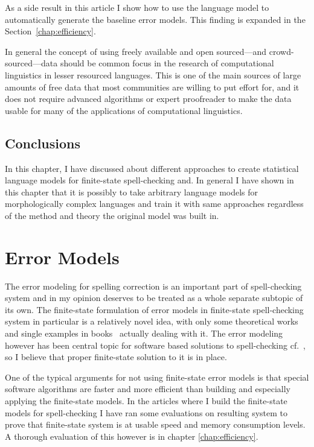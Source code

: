 \documentclass[officiallayout]{unihelcompling}
\begin{document}
As a side result in this article I show how to use the language model to
automatically generate the baseline error models. This finding is expanded in
the Section~\ref{chap:efficiency}.

In general the concept of using freely available and open sourced---and
crowd-sourced---data should be common focus in the research of computational
linguistics in lesser resourced languages. This is one of the main sources of
large amounts of free data that most communities are willing to put effort for,
and it does not require advanced algorithms or expert proofreader to make the
data usable for many of the applications of computational linguistics.

\section{Conclusions}

In this chapter, I have discussed about different approaches to create
statistical language models for finite-state spell-checking and.  In general I
have shown in this chapter that it is possibly to take arbitrary language
models for morphologically complex languages and train it with same approaches
regardless of the method and theory the original model was built in.


\chapter{Error Models}
\label{chap:error-models}

The error modeling for spelling correction is an important part of
spell-checking system and in my opinion deserves to be treated as a whole
separate subtopic of its own. The finite-state formulation of error models in
finite-state spell-checking system in particular is a relatively novel idea,
with only some theoretical works \citep{agata2002typographical,mohri2003edit}
and single examples in books~\citep{beesley2003finite} actually dealing with
it.  The error modeling however has been central topic for software based
solutions to spell-checking
cf.~\citet{deorowicz2005correcting,kukich1992spelling,mitton2009ordering,deorowicz2005correcting},
so I believe that proper finite-state solution to it is in place.

One of the typical arguments for not using finite-state error models is that
special software algorithms are faster and more efficient than building and
especially applying the finite-state models. In the articles where I build
the finite-state models for spell-checking I have ran some evaluations on
resulting system to prove that finite-state system is at usable speed
and memory consumption levels. A thorough evaluation of this however
is in chapter \ref{chap:efficiency}.
\end{document}
